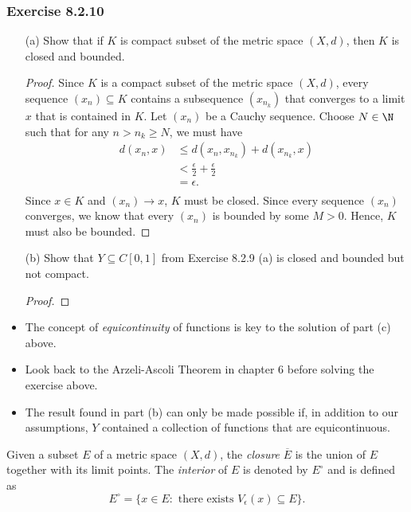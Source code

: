 \subsubsection{Exercise 8.2.10} 
\begin{enumerate}
    \item[(a)] Show that if \( K  \) is compact subset of the metric space \( (X,d)  \), then \( K  \) is closed and bounded.       
        \begin{proof}
        Since \( K  \) is a compact subset of the metric space \( (X,d) \), every sequence \( (x_{n}) \subseteq K  \) contains a subsequence \( (x_{n_{k }})  \) that converges to a limit \( x  \) that is contained in \( K  \). Let \( (x_{n}) \) be a Cauchy sequence. Choose \( N \in \N  \) such that for any \( n > n_{k } \geq N  \), we must have 
        \begin{align*}
            d(x_{n}, x ) &\leq d(x_{n}, x_{n_{k }}) + d(x_{n_{k }}, x)  \\
                         &< \frac{ \epsilon  }{ 2  } + \frac{ \epsilon  }{ 2 } \\ 
                         &= \epsilon.\\
        \end{align*}
        Since \( x \in K  \) and \( (x_{n}) \to x  \), \( K  \) must be closed. Since every sequence \( (x_{n})   \) converges, we know that every \( (x_{n})  \) is bounded by some \( M > 0  \). Hence, \( K  \) must also be bounded.
        \end{proof}
    \item[(b)] Show that \( Y \subseteq C[0,1]  \) from Exercise 8.2.9 (a) is closed and bounded but not compact.
        \begin{proof}
        
        \end{proof}
\end{enumerate}

\begin{itemize}
    \item The concept of \textit{equicontinuity} of functions is key to the solution of part (c) above.
    \item Look back to the Arzeli-Ascoli Theorem in chapter 6 before solving the exercise above.
    \item The result found in part (b) can only be made possible if, in addition to our assumptions, \( Y  \) contained a collection of functions that are equicontinuous.
\end{itemize}

\begin{tcolorbox}
\begin{defn}
    Given a subset \( E  \) of a metric space \( (X,d)  \), the \textit{closure} \( \overline{E} \) is the union of \( E  \) together with its limit points. The \textit{interior} of \( E \) is denoted by \( E^{\circ} \) and is defined as 
    \[  E^{\circ} = \{ x \in E : \text{ there exists } V_{\epsilon }(x) \subseteq E  \}. \]
\end{defn}
\end{tcolorbox}
